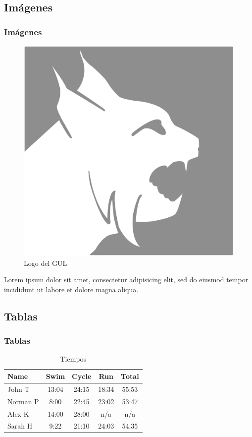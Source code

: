 \documentclass[aspectratio=43]{beamer}
\begin{document}
\subsection{Imágenes}

\begin{frame}
    \frametitle{Imágenes}
    \begin{figure}
        \includegraphics[scale=0.5]{img/logo1.png}
        \caption{Logo del GUL}
    \end{figure}
    Lorem ipsum dolor sit amet, consectetur adipisicing elit, sed do eiusmod tempor incididunt ut labore et dolore magna aliqua.
\end{frame}

\subsection{Tablas}

\begin{frame}
    \frametitle{Tablas}
    \begin{table}
        \begin{tabular}{l | c | c | c | c }
            Name & Swim & Cycle & Run & Total \\
            \hline \hline
            John T & 13:04 & 24:15 & 18:34 & 55:53 \\ 
            Norman P & 8:00 & 22:45 & 23:02 & 53:47\\
            Alex K & 14:00 & 28:00 & n/a & n/a\\
            Sarah H & 9:22 & 21:10 & 24:03 & 54:35 
        \end{tabular}
        \caption{Tiempos}
    \end{table}
\end{frame}
\end{document}

